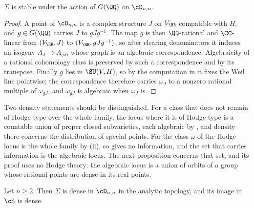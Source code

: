\begin{lemma}\label{lem:Ginvariance}
$\Sigma$ is stable under the action of $G(\QQ)$ on $\cD_{n,n}$.
\end{lemma}

\begin{proof}
A point of $\cD_{n,n}$ is a complex structure $J$ on $V_{\RR}$ compatible with
$H$, and $g\in G(\QQ)$ carries $J$ to $gJg^{-1}$. The map $g$ is then
$\QQ$-rational and $\CC$-linear from $(V_{\RR},J)$ to $(V_{\RR},gJg^{-1})$, so
after clearing denominators it induces an isogeny $A_{J}\to A_{gJ}$, whose
graph is an algebraic correspondence. Algebraicity of a rational cohomology
class is preserved by such a correspondence and by its transpose. Finally $g$
lies in $\SU(V,H)$, so by the computation in  it fixes
the Weil line pointwise; the correspondence therefore carries $\omega_{J}$ to
a nonzero rational multiple of $\omega_{gJ}$, and $\omega_{gJ}$ is algebraic
when $\omega_{J}$ is.
\end{proof}

Two density statements should be distinguished. For a class that does not
remain of Hodge type over the whole family, the locus where it is of Hodge
type is a countable union of proper closed subvarieties, each algebraic by
, and density there concerns the distribution of special
points. For the class $\omega$ of  the Hodge locus is the
whole family by (ii), so  gives no
information, and the set that carries information is the algebraic locus. The
next proposition concerns that set, and its proof uses no Hodge theory: the
algebraic locus is a union of orbits of a group whose rational points are
dense in its real points.

\begin{proposition}\label{prop:densealg}
Let $n\ge2$. Then $\Sigma$ is dense in $\cD_{n,n}$ in the analytic topology,
and its image in $\cS$ is dense.
\end{proposition}

